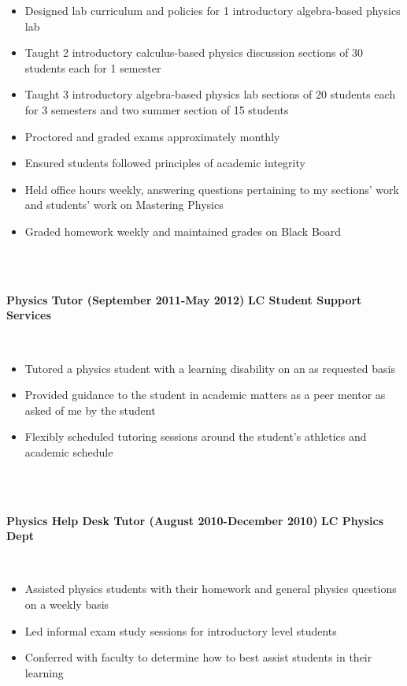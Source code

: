 \documentclass{article}
\begin{document}
\begin{itemize}
\item Designed lab curriculum and policies for 1 introductory algebra-based physics lab
\item Taught 2 introductory calculus-based physics discussion sections of 30 students each for 1 semester
\item Taught 3 introductory algebra-based physics lab sections of 20 students each for 3 semesters and two summer section of 15 students
\item Proctored and graded exams approximately monthly
\item Ensured students followed principles of academic integrity
\item Held office hours weekly, answering questions pertaining to my sections’ work and students’ work on Mastering Physics
\item Graded homework weekly and maintained grades on Black Board
\end{itemize}
\phantom \\
\phantom \\
%
%
%
%
\begin{vwcol}[widths={0.8,0.2}, sep=.8cm, justify=flush, rule=0pt, indent=0em]
\noindent \textbf{Physics Tutor (September 2011-May 2012)}
\newpage
\noindent \textbf{LC Student Support Services}
\end{vwcol}
\phantom \\
\begin{itemize}
\item Tutored a physics student with a learning disability on an as requested basis
\item Provided guidance to the student in academic matters as a peer mentor as asked of me by the student
\item Flexibly scheduled tutoring sessions around the student’s athletics and academic schedule
\end{itemize}
\phantom \\
\phantom \\
%
%
%
%
\begin{vwcol}[widths={0.8,0.2}, sep=.8cm, justify=flush, rule=0pt, indent=0em]
\noindent \textbf{Physics Help Desk Tutor (August 2010-December 2010)}
\newpage
\noindent \textbf{LC Physics Dept}
\end{vwcol}
\phantom \\
\begin{itemize}
\item Assisted physics students with their homework and general physics questions on a weekly basis
\item Led informal exam study sessions for introductory level students
\item Conferred with faculty to determine how to best assist students in their learning
\end{itemize}
\end{document}

